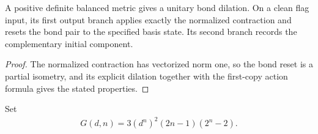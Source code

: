\begin{lemma}
    \label{thm:mpu_normalized_bond_dilation}
    \leanok
    A positive definite balanced metric gives a unitary bond dilation.
    On a clean flag input, its first output branch applies exactly
    the normalized contraction and resets the bond pair to the
    specified basis state. Its second branch records the complementary
    initial component.
\end{lemma}
\begin{proof}\leanok
    The normalized contraction has vectorized norm one, so the bond
    reset is a partial isometry, and its explicit dilation together with the
    first-copy action formula gives the stated properties.
\end{proof}

\begin{definition}
    \label{def:mpu_quantitative_unitary_synthesis}
    \leanok
    Set
    \begin{align}
        G(d,n)=3(d^n)^2(2n-1)(2^n-2).
    \end{align}
\end{definition}

